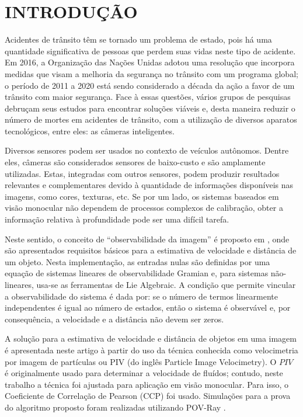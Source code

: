 \section{INTRODUÇÃO}

Acidentes de trânsito têm se tornado um problema de estado, pois há uma quantidade significativa de pessoas que
perdem suas vidas neste tipo de acidente. Em 2016, a Organização das Nações Unidas adotou uma 
resolução que incorpora medidas que visam 
a melhoria da segurança no trânsito com um programa global; 
o período de 2011 a 2020 está sendo considerado a década da ação a favor
de um trânsito com maior segurança.
Face à essas questões, vários grupos de pesquisas debruçam seus estudos 
para encontrar soluções viáveis e, desta maneira
reduzir o número de mortes em acidentes de trânsito, com a 
utilização de diversos aparatos tecnológicos, entre eles: as câmeras inteligentes.


Diversos sensores podem ser usados no contexto de veículos autônomos. Dentre eles, 
câmeras são considerados sensores de baixo-custo e são amplamente utilizadas. 
Estas, integradas com outros sensores, podem produzir resultados relevantes e complementares devido à 
quantidade de informações disponíveis nas imagens, como cores, texturas, etc. 
Se por um lado, os sistemas baseados em visão monocular não dependem de processos 
complexos de calibração, obter a informação relativa à profundidade pode ser uma difícil 
tarefa.


Neste sentido, o conceito de ``observabilidade da imagem'' é 
proposto em \cite{Breugel}, onde são apresentados requisitos 
básicos para a estimativa de velocidade e 
distância de um objeto. Nesta implementação, as entradas nulas 
são definidas por uma equação de sistemas lineares de observabilidade Gramian e,
para sistemas não-lineares, usa-se as ferramentas de Lie Algebraic. 
A condição que permite vincular a observabilidade do sistema é dada por:
se o número de termos linearmente independentes é igual ao número de estados, 
então o sistema é observável e, por consequência, a velocidade e a 
distância não devem ser zeros.

A solução para a estimativa de velocidade e distância de objetos em uma imagem é 
apresentada neste artigo à partir do uso da técnica 
conhecida como velocimetria por imagem de partículas ou PIV 
(do inglês Particle Image Velocimetry). 
O $PIV$ é originalmente usado para determinar a velocidade de fluídos; contudo, neste trabalho
a técnica foi ajustada para aplicação em visão monocular. Para isso, o Coeficiente de 
Correlação de Pearson (CCP) \cite{Miranda Neto} foi usado. Simulações 
para a prova do algoritmo proposto foram realizadas utilizando POV-Ray \cite{povray}.




















